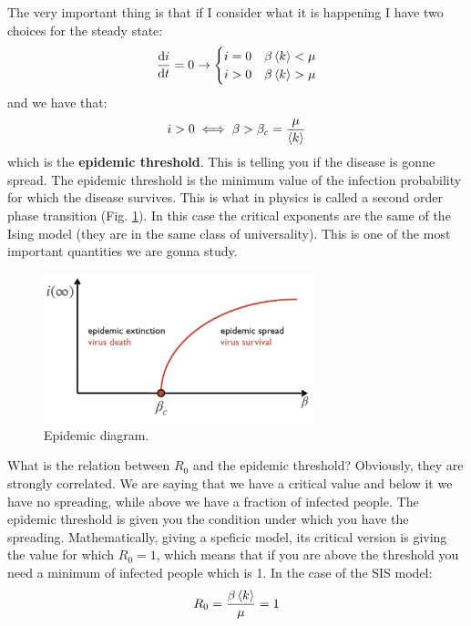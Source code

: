 \documentclass[../main/main.tex]{subfiles}
\begin{document}
The very important thing is that if I consider what it is happening I have two choices for the steady state:
\begin{equation*}
  \dv{i}{t} = 0 \rightarrow  \begin{cases}
   i=0 & \beta \expval{k} < \mu  \\
   i>0 & \beta \expval{k} > \mu
  \end{cases}
\end{equation*}
and we have that:
\begin{equation}
  i>0 \iff \beta > \beta_c = \frac{\mu }{ \expval{k} }
\end{equation}
which is the \textbf{epidemic threshold}. This is telling you if the disease is gonne spread.
The epidemic threshold is the minimum value of the infection probability for which the disease survives. This is what in physics is called a second order phase transition (Fig. \ref{fig:3_5}). In this case the critical exponents are the same of the Ising model (they are in the same class of universality).
This is one of the most important quantities we are gonna study.

\begin{figure}[h!]
\centering
\includegraphics[width=0.7\textwidth]{../lessons/image/03/5.png}
\caption{\label{fig:3_5} Epidemic diagram.}
\end{figure}

What is the relation between \( R_0 \) and the epidemic threshold? Obviously, they are strongly correlated. We are saying that we have a critical value and below it we have no spreading, while above we have a fraction of infected people.
The epidemic threshold is given you the condition under which you have the spreading. Mathematically, giving a speficic model, its critical version is giving the value for which \( R_0=1 \), which means that if you are above the threshold you need a minimum of infected people which is 1.  In the case of the SIS model:
\begin{equation}
  R_0 = \frac{\beta \expval{k} }{\mu } = 1
\end{equation}
\end{document}
